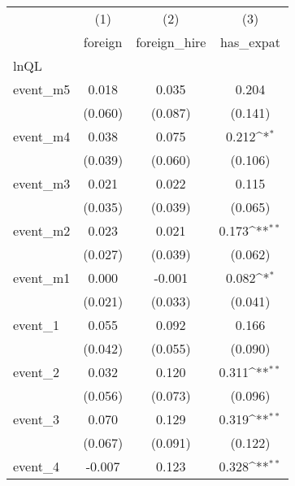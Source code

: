 {
\def\sym#1{\ifmmode^{#1}\else\(^{#1}\)\fi}
\begin{tabular}{l*{3}{c}}
\hline\hline
            &\multicolumn{1}{c}{(1)}&\multicolumn{1}{c}{(2)}&\multicolumn{1}{c}{(3)}\\
            &\multicolumn{1}{c}{ foreign}&\multicolumn{1}{c}{ foreign\_hire}&\multicolumn{1}{c}{ has\_expat}\\
\hline
lnQL        &                     &                     &                     \\
event\_m5    &       0.018         &       0.035         &       0.204         \\
            &     (0.060)         &     (0.087)         &     (0.141)         \\
[1em]
event\_m4    &       0.038         &       0.075         &       0.212\sym{*}  \\
            &     (0.039)         &     (0.060)         &     (0.106)         \\
[1em]
event\_m3    &       0.021         &       0.022         &       0.115         \\
            &     (0.035)         &     (0.039)         &     (0.065)         \\
[1em]
event\_m2    &       0.023         &       0.021         &       0.173\sym{**} \\
            &     (0.027)         &     (0.039)         &     (0.062)         \\
[1em]
event\_m1    &       0.000         &      -0.001         &       0.082\sym{*}  \\
            &     (0.021)         &     (0.033)         &     (0.041)         \\
[1em]
event\_1     &       0.055         &       0.092         &       0.166         \\
            &     (0.042)         &     (0.055)         &     (0.090)         \\
[1em]
event\_2     &       0.032         &       0.120         &       0.311\sym{**} \\
            &     (0.056)         &     (0.073)         &     (0.096)         \\
[1em]
event\_3     &       0.070         &       0.129         &       0.319\sym{**} \\
            &     (0.067)         &     (0.091)         &     (0.122)         \\
[1em]
event\_4     &      -0.007         &       0.123         &       0.328\sym{**} \\

\end{tabular}}
